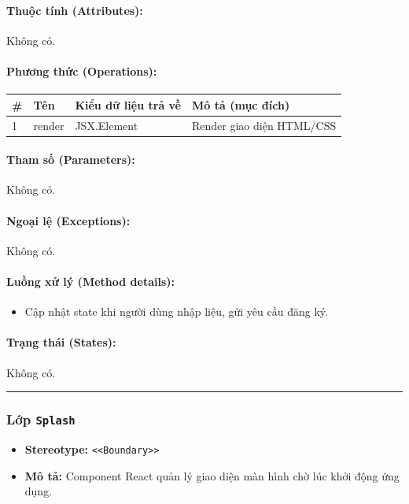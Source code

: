 \documentclass[12pt,a4paper]{article}
\begin{document}
\paragraph{Thuộc tính (Attributes):}
Không có.

\paragraph{Phương thức (Operations):}
\begin{longtable}{|p{0.6cm}|p{5.0cm}|p{2.8cm}|p{5.4cm}|}
\hline
\textbf{\#} & \textbf{Tên} & \textbf{Kiểu dữ liệu trả về} & \textbf{Mô tả (mục đích)} \\ \hline
\endhead
1 & render & JSX.Element & Render giao diện HTML/CSS \\ \hline
\end{longtable}

\paragraph{Tham số (Parameters):}
Không có.

\paragraph{Ngoại lệ (Exceptions):}
Không có.

\paragraph{Luồng xử lý (Method details):}
\begin{itemize}[leftmargin=*]
    \item Cập nhật state khi người dùng nhập liệu, gửi yêu cầu đăng ký.
\end{itemize}


\paragraph{Trạng thái (States):}
Không có.

\vskip 0.5cm
\noindent\rule{\textwidth}{0.5pt}
\vskip 0.5cm

\subsubsection{Lớp \texttt{Splash}}

\begin{itemize}[leftmargin=*]
    \item \textbf{Stereotype:} \texttt{\textless{}\textless{}Boundary\textgreater{}\textgreater{}}
    \item \textbf{Mô tả:} Component React quản lý giao diện màn hình chờ lúc khởi động ứng dụng.
\end{itemize}
\end{document}
